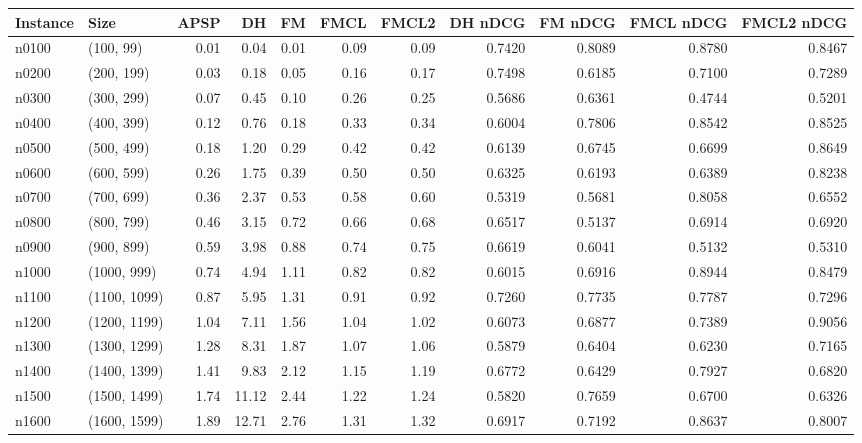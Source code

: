 \begin{tabular}{llrrrrrrrrr}
\toprule
Instance &         Size &  APSP &    DH &   FM &  FMCL &  FMCL2 &  DH nDCG &  FM nDCG &  FMCL nDCG &  FMCL2 nDCG \\
\midrule
   n0100 &    (100, 99) &  0.01 &  0.04 & 0.01 &  0.09 &   0.09 &   0.7420 &   0.8089 &     0.8780 &      0.8467 \\
   n0200 &   (200, 199) &  0.03 &  0.18 & 0.05 &  0.16 &   0.17 &   0.7498 &   0.6185 &     0.7100 &      0.7289 \\
   n0300 &   (300, 299) &  0.07 &  0.45 & 0.10 &  0.26 &   0.25 &   0.5686 &   0.6361 &     0.4744 &      0.5201 \\
   n0400 &   (400, 399) &  0.12 &  0.76 & 0.18 &  0.33 &   0.34 &   0.6004 &   0.7806 &     0.8542 &      0.8525 \\
   n0500 &   (500, 499) &  0.18 &  1.20 & 0.29 &  0.42 &   0.42 &   0.6139 &   0.6745 &     0.6699 &      0.8649 \\
   n0600 &   (600, 599) &  0.26 &  1.75 & 0.39 &  0.50 &   0.50 &   0.6325 &   0.6193 &     0.6389 &      0.8238 \\
   n0700 &   (700, 699) &  0.36 &  2.37 & 0.53 &  0.58 &   0.60 &   0.5319 &   0.5681 &     0.8058 &      0.6552 \\
   n0800 &   (800, 799) &  0.46 &  3.15 & 0.72 &  0.66 &   0.68 &   0.6517 &   0.5137 &     0.6914 &      0.6920 \\
   n0900 &   (900, 899) &  0.59 &  3.98 & 0.88 &  0.74 &   0.75 &   0.6619 &   0.6041 &     0.5132 &      0.5310 \\
   n1000 &  (1000, 999) &  0.74 &  4.94 & 1.11 &  0.82 &   0.82 &   0.6015 &   0.6916 &     0.8944 &      0.8479 \\
   n1100 & (1100, 1099) &  0.87 &  5.95 & 1.31 &  0.91 &   0.92 &   0.7260 &   0.7735 &     0.7787 &      0.7296 \\
   n1200 & (1200, 1199) &  1.04 &  7.11 & 1.56 &  1.04 &   1.02 &   0.6073 &   0.6877 &     0.7389 &      0.9056 \\
   n1300 & (1300, 1299) &  1.28 &  8.31 & 1.87 &  1.07 &   1.06 &   0.5879 &   0.6404 &     0.6230 &      0.7165 \\
   n1400 & (1400, 1399) &  1.41 &  9.83 & 2.12 &  1.15 &   1.19 &   0.6772 &   0.6429 &     0.7927 &      0.6820 \\
   n1500 & (1500, 1499) &  1.74 & 11.12 & 2.44 &  1.22 &   1.24 &   0.5820 &   0.7659 &     0.6700 &      0.6326 \\
   n1600 & (1600, 1599) &  1.89 & 12.71 & 2.76 &  1.31 &   1.32 &   0.6917 &   0.7192 &     0.8637 &      0.8007 \\

\end{tabular}
